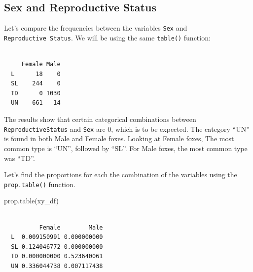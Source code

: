\documentclass[
  letterpaper,
]{report}
\newenvironment{Shaded}{\begin{snugshade}}{\end{snugshade}}
\newcommand{\CommentTok}[1]{\textcolor[rgb]{0.37,0.37,0.37}{#1}}
\newcommand{\FunctionTok}[1]{\textcolor[rgb]{0.28,0.35,0.67}{#1}}
\newcommand{\NormalTok}[1]{\textcolor[rgb]{0.00,0.23,0.31}{#1}}
\newcommand{\OtherTok}[1]{\textcolor[rgb]{0.00,0.23,0.31}{#1}}
\newcommand{\SpecialCharTok}[1]{\textcolor[rgb]{0.37,0.37,0.37}{#1}}
\begin{document}
\subsection{Sex and Reproductive
Status}\label{sex-and-reproductive-status}

Let's compare the frequencies between the variables \texttt{Sex} and
\texttt{Reproductive\ Status}. We will be using the same
\texttt{table()} function:

\begin{Shaded}
\end{Shaded}

\begin{verbatim}
    
     Female Male
  L      18    0
  SL    244    0
  TD      0 1030
  UN    661   14
\end{verbatim}

The results show that certain categorical combinations between
\texttt{ReproductiveStatus} and \texttt{Sex} are 0, which is to be
expected. The category ``UN'' is found in both Male and Female foxes.
Looking at Female foxes, The most common type is ``UN'', followed by
``SL''. For Male foxes, the most common type was ``TD''.

Let's find the proportions for each the combination of the variables
using the \texttt{prop.table()} function.

\begin{Shaded}
\begin{Highlighting}[]
\FunctionTok{prop.table}\NormalTok{(xy\_df)}
\end{Highlighting}
\end{Shaded}

\begin{verbatim}
    
          Female        Male
  L  0.009150991 0.000000000
  SL 0.124046772 0.000000000
  TD 0.000000000 0.523640061
  UN 0.336044738 0.007117438
\end{verbatim}
\end{document}
